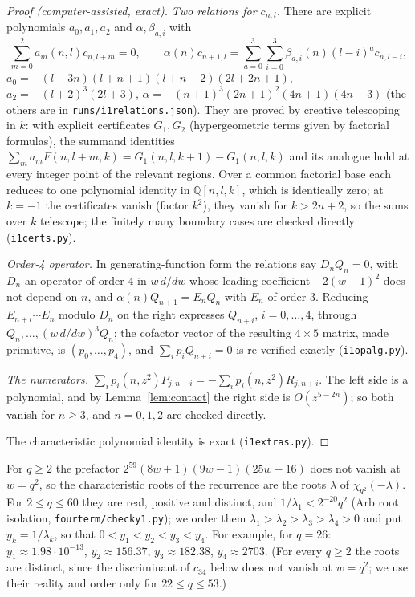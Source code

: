 \documentclass[11pt]{amsart}
\theoremstyle{definition}
\theoremstyle{remark}
\numberwithin{equation}{section}
\newcommand{\QQ}{\mathbb{Q}}
\newcommand{\file}[1]{{\def\_{\textunderscore\allowbreak}\texttt{#1}}}
\begin{document}
\begin{proof}[Proof (computer-assisted, exact)]
\emph{Two relations for $c_{n,l}$.} There are explicit polynomials $a_0,a_1,a_2$ and $\alpha,\beta_{a,i}$ with
\[
\sum_{m=0}^2a_m(n,l)c_{n,l+m}=0,\qquad
\alpha(n)c_{n+1,l}=\sum_{a=0}^3\sum_{i=0}^3\beta_{a,i}(n)(l-i)^ac_{n,l-i},
\]
$a_0=-(l-3n)(l+n+1)(l+n+2)(2l+2n+1)$, $a_2=-(l+2)^3(2l+3)$, $\alpha=-(n+1)^3(2n+1)^2(4n+1)(4n+3)$ (the others are in
\file{runs/i1\_relations.json}). They are proved by creative telescoping in $k$: with explicit certificates $G_1,G_2$
(hypergeometric terms given by factorial formulas), the summand identities
$\sum_ma_mF(n,l+m,k)=G_1(n,l,k+1)-G_1(n,l,k)$ and its analogue hold at every integer point of the relevant regions.
Over a common factorial base each reduces to one polynomial identity in $\QQ[n,l,k]$, which is identically zero; at
$k=-1$ the certificates vanish (factor $k^2$), they vanish for $k>2n+2$, so the sums over $k$ telescope; the finitely
many boundary cases are checked directly (\file{i1\_certs.py}).

\emph{Order-4 operator.} In generating-function form the relations say $D_nQ_n=0$, with $D_n$ an operator of order $4$
in $w\,d/dw$ whose leading coefficient $-2(w-1)^2$ does not depend on $n$, and $\alpha(n)Q_{n+1}=E_nQ_n$ with $E_n$ of
order $3$. Reducing $E_{n+i}\cdots E_n$ modulo $D_n$ on the right expresses $Q_{n+i}$, $i=0,\dots,4$, through
$Q_n,\dots,(w\,d/dw)^3Q_n$; the cofactor vector of the resulting $4\times5$ matrix, made primitive, is
$(p_0,\dots,p_4)$, and $\sum_ip_iQ_{n+i}=0$ is re-verified exactly (\file{i1\_opalg.py}).

\emph{The numerators.} $\sum_ip_i(n,z^2)P_{j,n+i}=-\sum_ip_i(n,z^2)R_{j,n+i}$. The left side is a polynomial, and by
Lemma~\ref{lem:contact} the right side is $O(z^{5-2n})$; so both vanish for $n\ge3$, and $n=0,1,2$ are checked directly.

The characteristic polynomial identity is exact (\file{i1\_extras.py}).
\end{proof}

For $q\ge2$ the prefactor $2^{59}(8w+1)(9w-1)(25w-16)$ does not vanish at $w=q^2$, so the characteristic roots of the
recurrence are the roots $\lambda$ of $\chi_{q^2}(-\lambda)$. For $2\le q\le60$ they are real, positive and distinct, and
$1/\lambda_1<2^{-20}q^2$ (Arb root isolation, \file{fourterm/check\_y1.py}); we order them
$\lambda_1>\lambda_2>\lambda_3>\lambda_4>0$ and put $y_k=1/\lambda_k$, so that $0<y_1<y_2<y_3<y_4$. For example, for
$q=26$: $y_1\approx1.98\cdot10^{-13}$, $y_2\approx156.37$, $y_3\approx182.38$, $y_4\approx2703$. (For every $q\ge2$ the
roots are distinct, since the discriminant of $c_{34}$ below does not vanish at $w=q^2$; we use their reality and order
only for $22\le q\le53$.)
\end{document}

